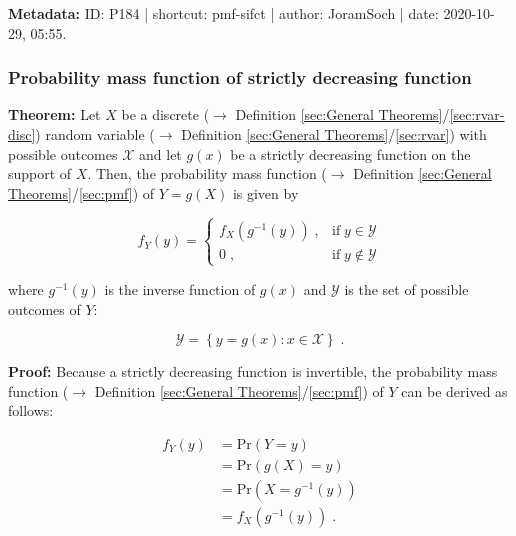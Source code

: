 \documentclass[a4paper,12pt,twoside]{book}
\begin{document}
\vspace{1em}
\textbf{Metadata:} ID: P184 | shortcut: pmf-sifct | author: JoramSoch | date: 2020-10-29, 05:55.
\vspace{1em}



\subsubsection[\textbf{Probability mass function of strictly decreasing function}]{Probability mass function of strictly decreasing function} \label{sec:pmf-sdfct}
\setcounter{equation}{0}

\textbf{Theorem:} Let $X$ be a discrete ($\rightarrow$ Definition \ref{sec:General Theorems}/\ref{sec:rvar-disc}) random variable ($\rightarrow$ Definition \ref{sec:General Theorems}/\ref{sec:rvar}) with possible outcomes $\mathcal{X}$ and let $g(x)$ be a strictly decreasing function on the support of $X$. Then, the probability mass function ($\rightarrow$ Definition \ref{sec:General Theorems}/\ref{sec:pmf}) of $Y = g(X)$ is given by

\begin{equation} \label{eq:pmf-sdfct-pmf-sdfct}
f_Y(y) = \left\{
\begin{array}{rl}
f_X(g^{-1}(y)) \; , & \text{if} \; y \in \mathcal{Y} \\
0 \; , & \text{if} \; y \notin \mathcal{Y}
\end{array}
\right.
\end{equation}

where $g^{-1}(y)$ is the inverse function of $g(x)$ and $\mathcal{Y}$ is the set of possible outcomes of $Y$:

\begin{equation} \label{eq:pmf-sdfct-Y-range}
\mathcal{Y} = \left\lbrace y = g(x): x \in \mathcal{X} \right\rbrace \; .
\end{equation}


\vspace{1em}
\textbf{Proof:} Because a strictly decreasing function is invertible, the probability mass function ($\rightarrow$ Definition \ref{sec:General Theorems}/\ref{sec:pmf}) of $Y$ can be derived as follows:

\begin{equation} \label{eq:pmf-sdfct-pmf-sdfct-qed}
\begin{split}
f_Y(y) &= \mathrm{Pr}(Y = y) \\
&= \mathrm{Pr}(g(X) = y) \\
&= \mathrm{Pr}(X = g^{-1}(y)) \\
&= f_X(g^{-1}(y)) \; .
\end{split}
\end{equation}
\end{document}
